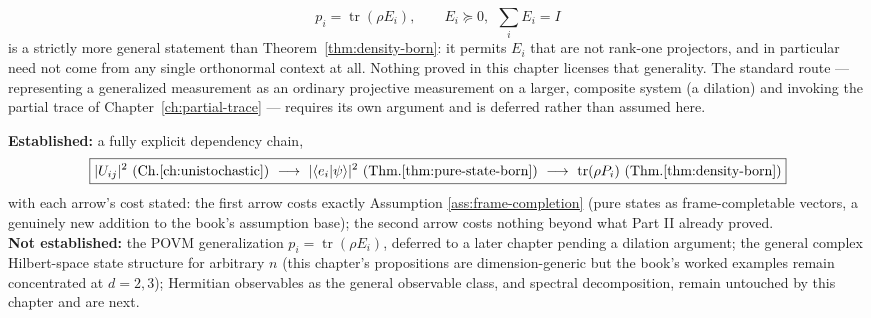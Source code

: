 \begin{equation}
p_i = \operatorname{tr}(\rho E_i), \qquad E_i \succeq 0,\ \ \sum_i E_i = I
\end{equation}
is a strictly more general statement than Theorem~\ref{thm:density-born}: it
permits $E_i$ that are not rank-one projectors, and in particular need not
come from any single orthonormal context at all. Nothing proved in this
chapter licenses that generality. The standard route — representing a
generalized measurement as an ordinary projective measurement on a larger,
composite system (a dilation) and invoking the partial trace of
Chapter~\ref{ch:partial-trace} — requires its own argument and is deferred
rather than assumed here.

\begin{ledgerentry}
\textbf{Established:} a fully explicit dependency chain,
\begin{equation}
\boxed{|U_{ij}|^2 \ (\text{Ch.}\ref{ch:unistochastic}) \ \longrightarrow\
|\langle e_i|\psi\rangle|^2 \ (\text{Thm.}\ref{thm:pure-state-born}) \
\longrightarrow\ \operatorname{tr}(\rho P_i) \ (\text{Thm.}\ref{thm:density-born})}
\end{equation}
with each arrow's cost stated: the first arrow costs exactly Assumption
\ref{ass:frame-completion} (pure states as frame-completable vectors, a
genuinely new addition to the book's assumption base); the second arrow costs
nothing beyond what Part II already proved.\\
\textbf{Not established:} the POVM generalization $p_i =
\operatorname{tr}(\rho E_i)$, deferred to a later chapter pending a dilation
argument; the general complex Hilbert-space state structure for arbitrary $n$
(this chapter's propositions are dimension-generic but the book's worked
examples remain concentrated at $d=2,3$); Hermitian observables as the
general observable class, and spectral decomposition, remain untouched by
this chapter and are next.
\end{ledgerentry}
